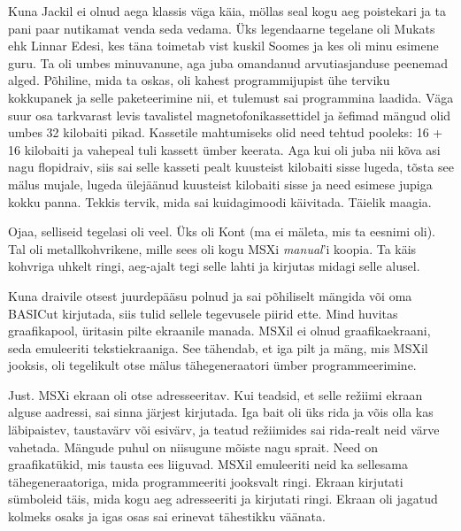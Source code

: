 Kuna Jackil ei olnud aega klassis väga käia,
möllas seal kogu aeg poistekari ja ta pani paar nutikamat venda 
seda vedama. Üks legendaarne tegelane oli 
Mukats ehk Linnar Edesi, kes täna toimetab vist kuskil Soomes ja kes oli minu esimene 
guru. Ta oli umbes minuvanune, aga juba omandanud 
arvutiasjanduse peenemad alged. Põhiline, mida ta oskas, oli kahest 
programmijupist ühe terviku kokkupanek ja selle paketeerimine nii, et 
tulemust sai programmina laadida.
Väga suur osa tarkvarast levis tavalistel magnetofonikassettidel ja 
šefimad mängud olid umbes 32 kilobaiti pikad. 
Kassetile mahtumiseks olid need tehtud pooleks: 16 + 16 
kilobaiti ja vahepeal tuli kassett ümber keerata. Aga kui oli juba nii kõva asi nagu 
flopidraiv, siis sai selle kasseti pealt kuusteist kilobaiti sisse lugeda, tõsta 
see mälus mujale, lugeda ülejäänud kuusteist kilobaiti sisse ja need esimese jupiga 
kokku panna. Tekkis tervik, mida sai kuidagimoodi käivitada. 
Täielik maagia. 


Ojaa, selliseid tegelasi oli veel. Üks oli 
Kont (ma ei mäleta, mis ta eesnimi oli). Tal oli 
metallkohvrikene, mille sees oli kogu MSXi \emph{manual}'i koopia. Ta käis kohvriga uhkelt ringi, aeg-ajalt tegi 
selle lahti ja kirjutas midagi selle alusel.

Kuna draivile otsest juurdepääsu polnud ja sai põhiliselt 
mängida või oma BASICut kirjutada, siis tulid sellele 
tegevusele piirid ette. Mind huvitas graafikapool, 
üritasin pilte ekraanile manada. MSXil ei olnud graafikaekraani, seda emuleeriti tekstiekraaniga. See tähendab, et
iga pilt ja mäng, mis MSXil jooksis, oli 
tegelikult otse mälus tähegeneraatori ümber programmeerimine. 


Just. MSXi ekraan oli otse adresseeritav. Kui 
teadsid, et selle režiimi ekraan alguse aadressi, sai sinna järjest kirjutada. Iga bait 
oli üks rida ja võis olla kas läbipaistev, taustavärv või esivärv, ja teatud
režiimides sai rida-realt neid värve vahetada. 
Mängude puhul on niisugune mõiste nagu sprait. Need on graafikatükid, mis tausta ees liiguvad. MSXil 
emuleeriti neid ka sellesama tähegeneraatoriga, mida programmeeriti jooksvalt ringi. 
Ekraan kirjutati sümboleid täis, mida kogu aeg adresseeriti ja 
kirjutati ringi. Ekraan oli jagatud kolmeks osaks ja igas osas sai erinevat 
tähestikku väänata.

